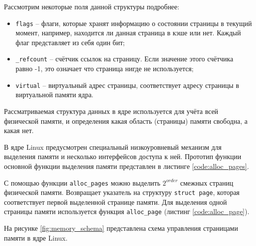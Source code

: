 Рассмотрим некоторые поля данной структуры подробнее:

\begin{itemize}
	\item \texttt{flags} -- флаги, которые хранят информацию о состоянии страницы в текущий момент, например, находится ли данная страница в кэше или нет. Каждый флаг представляет из себя один бит;
	\item \texttt{\_refcount} -- счётчик ссылок на страницу. Если значение этого счётчика равно -1, это означает что страница нигде не используется;
	\item \texttt{virtual} -- виртуальный адрес страницы, соответствует адресу страницы в виртуальной памяти ядра.
\end{itemize}

Рассматриваемая структура данных в ядре используется для учёта всей физической памяти, и определения какая область (страницы) памяти свободна, а какая нет. 

В ядре Linux предусмотрен специальный низкоуровневый механизм для выделения памяти и несколько интерфейсов доступа к ней. Прототип функции основной функции выделения памяти представлен в листинге \ref{code:alloc_pages}.


С помощью функции \texttt{alloc\_pages} можно выделить $2^{order}$ смежных страниц физической памяти. Возвращает указатель на структуру \texttt{struct page}, которая соответствует первой выделенной странице памяти. Для выделения одной страницы памяти используется функция \texttt{alloc\_page} (листинг \ref{code:alloc_page}).


На рисунке \ref{fig:memory_schema} представлена схема управления страницами памяти в ядре Linux.

